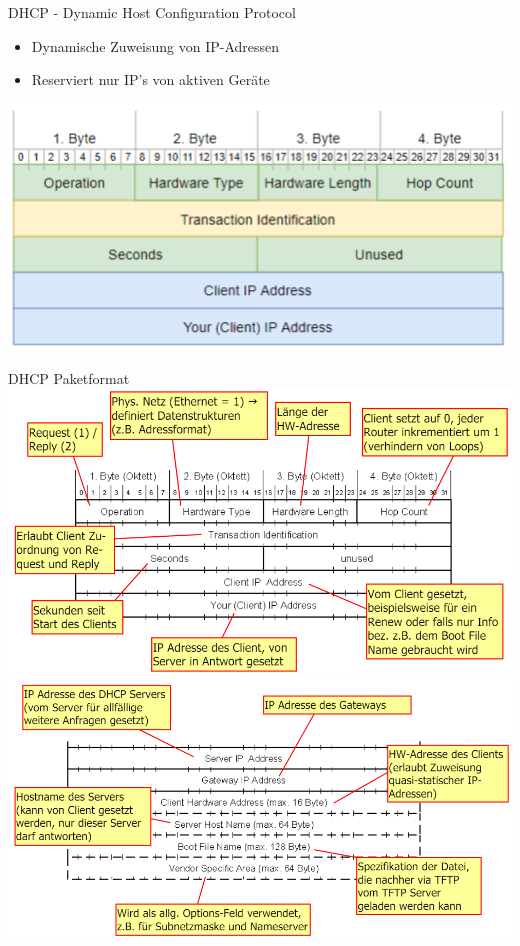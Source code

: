 \begin{definition}{DHCP - Dynamic Host Configuration Protocol}
    \begin{itemize}
        \item Dynamische Zuweisung von IP-Adressen
        \item Reserviert nur IP’s von aktiven Geräte
    \end{itemize}
    \includegraphics[width=1\linewidth]{images/bootp.png}
\end{definition}

\begin{definition}{DHCP Paketformat}\\
    \includegraphics[width=1\linewidth]{images/dhcp_format1.png}\\
    \includegraphics[width=1\linewidth]{images/dhcp_format2.png}
\end{definition}






